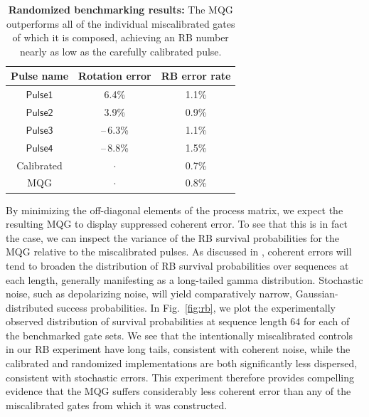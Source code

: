 \documentclass[aps,nofootinbib,pra,notitlepage,twocolumn]{revtex4-1}
\newcommand{\0}{\ensuremath{\mathbf{0}}}
\begin{document}
\setlength{\tabcolsep}{0.5em} 
{\renewcommand{\arraystretch}{1.2}
\begin{table}[h]
	\centering
	\begin{tabular}{@{}ccc@{}}
		\hline
		Pulse name & Rotation error & RB error rate\\
		\hline
		$\mathsf{Pulse1}$ 	& 6.4\% 	& 1.1\% \\
		$\mathsf{Pulse2}$ 	& 3.9\% 	& 0.9\% \\
		$\mathsf{Pulse3}$ 	& --\,6.3\% 	& 1.1\% \\
		$\mathsf{Pulse4}$ 	& --\,8.8\% 	& 1.5\% \\
		Calibrated 			& $\cdot$  	& 0.7\% \\
		MQG 				& $\cdot$ 	& 0.8\% \\
		\hline
	\end{tabular}
	\caption{\textbf{Randomized benchmarking results:} The MQG outperforms all of the individual miscalibrated gates of which it is composed, achieving an RB number nearly as low as the carefully calibrated pulse. }
\label{tabl:rb}
\end{table}

By minimizing the off-diagonal elements of the process matrix, we expect the resulting MQG to display suppressed coherent error. To see that this is in fact the case, we can inspect the variance of the RB survival probabilities for the MQG relative to the miscalibrated pulses. As discussed in \cite{Ball2016}, coherent errors will tend to broaden the distribution of RB survival probabilities over sequences at each length, generally manifesting as a long-tailed gamma distribution. Stochastic noise, such as depolarizing noise, will yield comparatively narrow, Gaussian-distributed success probabilities. In Fig.~\ref{fig:rb}, we plot the experimentally observed distribution of survival probabilities at sequence length $64$ for each of the benchmarked gate sets. We see that the intentionally miscalibrated controls in our RB experiment have long tails, consistent with coherent noise, while the calibrated and randomized implementations are both significantly less dispersed, consistent with stochastic errors. This experiment therefore provides compelling evidence that the MQG suffers considerably less coherent error than any of the miscalibrated gates from which it was constructed.


}
\end{document}
